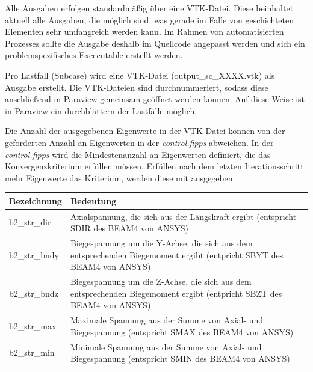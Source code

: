 \documentclass[11pt,titlepage,listof=totoc,bibliography=totoc,twoside]{scrreprt}
\begin{document}
{{Alle Ausgaben erfolgen standardmäßig über eine VTK-Datei. Diese beinhaltet aktuell alle Ausgaben, die möglich sind, was gerade im Falle von geschichteten Elementen sehr umfangreich werden kann. Im Rahmen von automatisierten Prozesses sollte die Ausgabe deshalb im Quellcode angepasst werden und sich ein problemspezifisches Excecutable erstellt werden.

Pro Lastfall (Subcase) wird eine VTK-Datei (output\_sc\_XXXX.vtk) als Ausgabe erstellt. Die VTK-Dateien sind durchnummeriert, sodass diese anschließend in Paraview gemeinsam geöffnet werden können. Auf diese Weise ist in Paraview ein durchblättern der Lastfälle möglich.

Die Anzahl der ausgegebenen Eigenwerte in der VTK-Datei können von der geforderten Anzahl an Eigenwerten in der \emph{control.fipps} abweichen. In der \emph{control.fipps} wird die Mindestenanzahl an Eigenwerten definiert, die das Konvergenzkriterium erfüllen müssen. Erfüllen nach dem letzten Iterationsschritt mehr Eigenwerte das Kriterium, werden diese mit ausgegeben.

\begin{tabularx}{\textwidth}{lX}
\toprule
Bezeichnung		& Bedeutung	\\
\midrule
b2\_str\_dir		& Axialspannung, die sich aus der Längskraft ergibt (entspricht SDIR des BEAM4 von ANSYS) \\
b2\_str\_bndy		& Biegespannung um die Y-Achse, die sich aus dem entsprechenden Biegemoment ergibt (entpricht SBYT des BEAM4 von ANSYS) \\
b2\_str\_bndz		& Biegespannung um die Z-Achse, die sich aus dem entsprechenden Biegemoment ergibt (entpricht SBZT des BEAM4 von ANSYS) \\
b2\_str\_max		& Maximale Spannung aus der Summe von Axial- und Biegespannung (entspricht SMAX des BEAM4 von ANSYS) \\
b2\_str\_min		& Minimale Spannung aus der Summe von Axial- und Biegespannung (entspricht SMIN des BEAM4 von ANSYS) \\
\bottomrule
\end{tabularx}

}}
\end{document}
